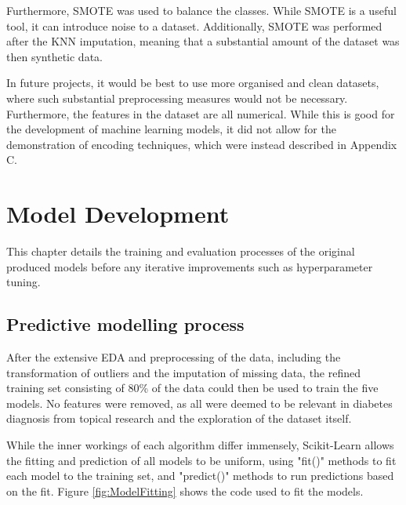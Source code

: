 \documentclass[12pt]{report}
\newcommand{\para}{\vspace{8pt}\noindent}
\begin{document}
\para Furthermore, SMOTE was used to balance the classes. While SMOTE is a useful tool, it can introduce noise to a dataset.
Additionally, SMOTE was performed after the KNN imputation, meaning that a substantial amount of the dataset was then synthetic data.

\para In future projects, it would be best to use more organised and clean datasets, where such substantial 
preprocessing measures would not be necessary. Furthermore, the features in the dataset are all numerical.
While this is good for the development of machine learning models, it did not allow for the demonstration 
of encoding techniques, which were instead described in Appendix C.

\chapter{Model Development} %
This chapter details the training and evaluation processes of the original produced models
before any iterative improvements such as hyperparameter tuning.


\section{Predictive modelling process}
After the extensive EDA and preprocessing of the data, including the transformation of outliers and the imputation of
missing data, the refined training set consisting of 80\% of the data could then be used to train the five models. 
No features were removed, as all were deemed to be relevant in diabetes diagnosis from topical research and the
exploration of the dataset itself. 

\para While the inner workings of each algorithm differ immensely, Scikit-Learn allows the fitting and prediction of 
all models to be uniform, using "fit()" methods to fit each model to the training set, and "predict()" methods to run 
predictions based on the fit. Figure \ref{fig:ModelFitting} shows the code used to fit the models.
\end{document}
